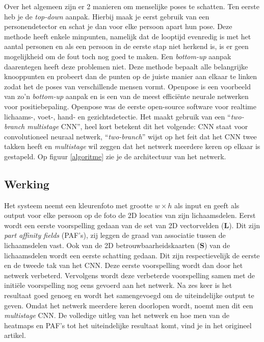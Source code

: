 \documentclass[a4paper,twoside,kulak]{kulakreport}
\begin{document}
Over het algemeen zijn er 2 manieren om menselijke poses te schatten. Ten eerste heb je de \textit{top-down} aanpak. Hierbij maak je eerst gebruik van een personendetector en schat je dan voor elke persoon apart hun pose.  Deze methode heeft enkele minpunten, namelijk dat de looptijd evenredig is met het aantal personen en als een persoon in de eerste stap niet herkend is, is er geen mogelijkheid om de fout toch nog goed te maken. Een \textit{bottom-up} aanpak daarentegen heeft deze problemen niet. Deze methode bepaalt alle belangrijke knooppunten en probeert dan de punten op de juiste manier aan elkaar te linken zodat het de poses van verschillende mensen vormt. Openpose is een voorbeeld van zo’n \textit{bottom-up} aanpak en is een van de meest efficiënte neurale netwerken voor positiebepaling. Openpose was de eerste open-source software voor realtime lichaams-, voet-, hand- en gezichtsdetectie. Het maakt gebruik van een “\textit{two-branch multistage} CNN”, heel kort betekent dit het volgende: CNN staat voor convolutioneel neuraal netwerk, “\textit{two-branch}” wijst op het feit dat het CNN twee takken heeft en \textit{multistage} wil zeggen dat het netwerk meerdere keren op elkaar is gestapeld. Op figuur \ref{algoritme} zie je de architectuur van het netwerk.

\subsection{Werking}

Het systeem neemt een kleurenfoto met grootte $w \times h$ als input en geeft als output voor elke persoon op de foto de 2D locaties van zijn lichaamsdelen. Eerst wordt een eerste voorspelling gedaan van de set van 2D vectorvelden ($\textbf{L}$). Dit zijn \textit{part affinity fields} (PAF's), zij leggen de graad van associatie tussen de lichaamsdelen vast. Ook van de 2D betrouwbaarheidskaarten ($\textbf{S}$) van de lichaamsdelen wordt een eerste schatting gedaan. Dit zijn respectievelijk de eerste en de tweede tak van het CNN. Deze eerste voorspelling wordt dan door het netwerk verbeterd. Vervolgens wordt deze verbeterde voorspelling samen met de initiële voorspelling nog eens gevoerd aan het netwerk. Na zes keer is het resultaat goed genoeg en wordt het samengevoegd om de uiteindelijke output te geven. Omdat het netwerk meerdere keren doorlopen wordt, noemt men dit een \textit{multistage} CNN. De volledige uitleg van het netwerk en hoe men van de heatmaps en PAF's tot het uiteindelijke resultaat komt, vind je in het origineel artikel.\cite{cao2019openpose}
\end{document}
